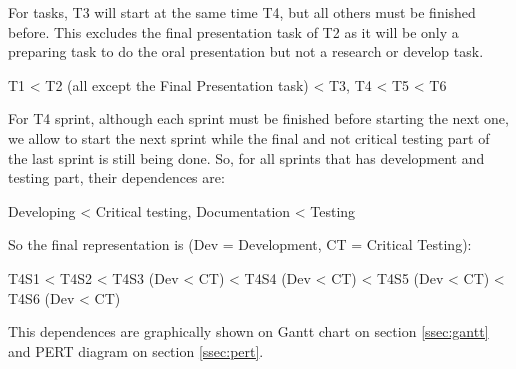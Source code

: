\begin{description}
\item For tasks, T3 will start at the same time T4, but all others must be finished before. This excludes the final presentation task of T2 as it will be only a preparing task to do the oral presentation but not a research or develop task.

\begin{center} T1 < T2 (all except the Final Presentation task) < T3, T4 < T5 < T6 \end{center}

\item For T4 sprint, although each sprint must be finished before starting the next one, we allow to start the next sprint while the final and not critical testing part of the last sprint is still being done. So, for all sprints that has development and testing part, their dependences are:

\begin{center} Developing < Critical testing, Documentation < Testing \end{center}

So the final representation is (Dev = Development, CT = Critical Testing):

\begin{center} T4S1 < T4S2 < T4S3 (Dev < CT) < T4S4 (Dev < CT) < T4S5 (Dev < CT) < T4S6 (Dev < CT) \end{center}

This dependences are graphically shown on Gantt chart on section \ref{ssec:gantt} and PERT diagram on section \ref{ssec:pert}.
\end{description}